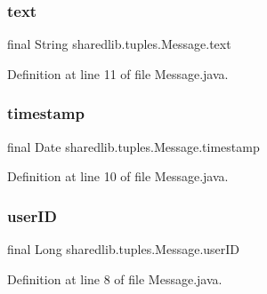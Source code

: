 \hypertarget{classsharedlib_1_1tuples_1_1_message_a3b36d09693c30bf324c5efd91f932eb5}{}\label{classsharedlib_1_1tuples_1_1_message_a3b36d09693c30bf324c5efd91f932eb5} 
\subsubsection{\texorpdfstring{text}{text}}
{\footnotesize\ttfamily final String sharedlib.\+tuples.\+Message.\+text}



Definition at line 11 of file Message.\+java.

\hypertarget{classsharedlib_1_1tuples_1_1_message_af3abb7c369e9a9ad59808f9a0118f787}{}\label{classsharedlib_1_1tuples_1_1_message_af3abb7c369e9a9ad59808f9a0118f787} 
\subsubsection{\texorpdfstring{timestamp}{timestamp}}
{\footnotesize\ttfamily final Date sharedlib.\+tuples.\+Message.\+timestamp}



Definition at line 10 of file Message.\+java.

\hypertarget{classsharedlib_1_1tuples_1_1_message_a2cff2bb100c096bd45b4edeb1f305e3f}{}\label{classsharedlib_1_1tuples_1_1_message_a2cff2bb100c096bd45b4edeb1f305e3f} 
\subsubsection{\texorpdfstring{user\+ID}{userID}}
{\footnotesize\ttfamily final Long sharedlib.\+tuples.\+Message.\+user\+ID}



Definition at line 8 of file Message.\+java.

\hypertarget{classsharedlib_1_1tuples_1_1_message_ada81e5986a0d18e2bee75e4283a9a815}{}\label{classsharedlib_1_1tuples_1_1_message_ada81e5986a0d18e2bee75e4283a9a815} 
